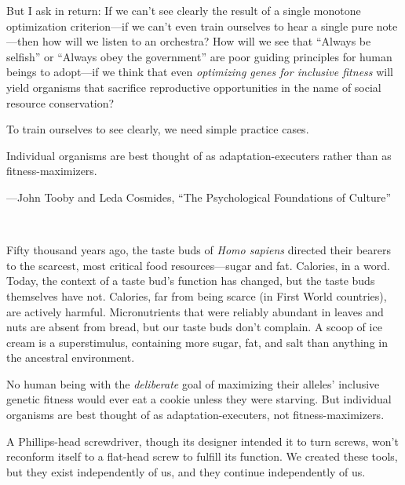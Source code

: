 {
 But I ask in return: If we can't see clearly the
result of a single monotone optimization criterion---if we
can't even train ourselves to hear a single pure
note---then how will we listen to an orchestra? How will we see that
``Always be selfish'' or
``Always obey the government'' are
poor guiding principles for human beings to adopt---if we think that
even \textit{optimizing genes for inclusive fitness} will yield
organisms that sacrifice reproductive opportunities in the name of
social resource conservation?}

{
 To train ourselves to see clearly, we need simple practice cases.}

\myendsectiontext


{
 Individual organisms are best thought of as adaptation-executers
rather than as fitness-maximizers.}

{\raggedleft
 {}---John Tooby and Leda Cosmides,\newline
 ``The Psychological Foundations of
Culture''
\par}


\bigskip

{
 ~}

{
 Fifty thousand years ago, the taste buds of \textit{Homo sapiens}
directed their bearers to the scarcest, most critical food
resources---sugar and fat. Calories, in a word. Today, the context of a
taste bud's function has changed, but the taste buds
themselves have not. Calories, far from being scarce (in First World
countries), are actively harmful. Micronutrients that were reliably
abundant in leaves and nuts are absent from bread, but our taste buds
don't complain. A scoop of ice cream is a
superstimulus, containing more sugar, fat, and salt than anything in
the ancestral environment.}

{
 No human being with the \textit{deliberate} goal of maximizing
their alleles' inclusive genetic fitness would ever eat
a cookie unless they were starving. But individual organisms are best
thought of as adaptation-executers, not fitness-maximizers.}

{
 A Phillips-head screwdriver, though its designer intended it to
turn screws, won't reconform itself to a flat-head
screw to fulfill its function. We created these tools, but they exist
independently of us, and they continue independently of us.}

